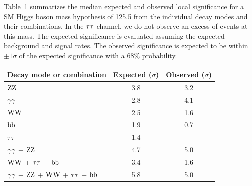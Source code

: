 \documentclass[11pt,twoside,a4paper,cmspaper,final,collab]{cms-tdr}
\begin{document}
Table~\ref{tab:Signif} summarizes the median expected and observed local significance
for a SM Higgs boson mass hypothesis of 125.5\GeV
from the individual decay modes and their combinations.
In the $\tau\tau$ channel, we do not observe an excess of events at this mass.
The expected significance is evaluated assuming
the expected background and signal rates.
The observed significance is expected to be within $\pm 1\sigma$  of
the expected significance with a 68\% probability.


\begin{table}[htbp]
\begin{center}
\label{tab:Signif}
\begin{tabular}{l|c|c}
\hline
Decay mode or combination & Expected ($\sigma$) & Observed ($\sigma$) \\
\hline\hline
$\mathrm{Z}\mathrm{Z}$    &  3.8  & 3.2  \\ %
$\gamma\gamma$    &  2.8  & 4.1  \\ %
$\mathrm{W}\mathrm{W}$      &  2.5 &  1.6  \\ %
$\mathrm{b}\mathrm{b}$  &  1.9 &  0.7  \\ %
$\tau\tau$    &  1.4 &  --   \\ %
\hline
$\gamma\gamma$ + $\mathrm{Z}\mathrm{Z}$                 & 4.7  & 5.0 \\
$\mathrm{W}\mathrm{W}$ + $\tau\tau$ + $\mathrm{b}\mathrm{b}$    & 3.4  & 1.6 \\
\hline
$\gamma\gamma$ + $\mathrm{Z}\mathrm{Z}$ + $\mathrm{W}\mathrm{W}$ + $\tau\tau$ + $\mathrm{b}\mathrm{b}$ & 5.8 & 5.0 \\%
\hline
\end{tabular}
\end{center}
\end{table}
\end{document}
